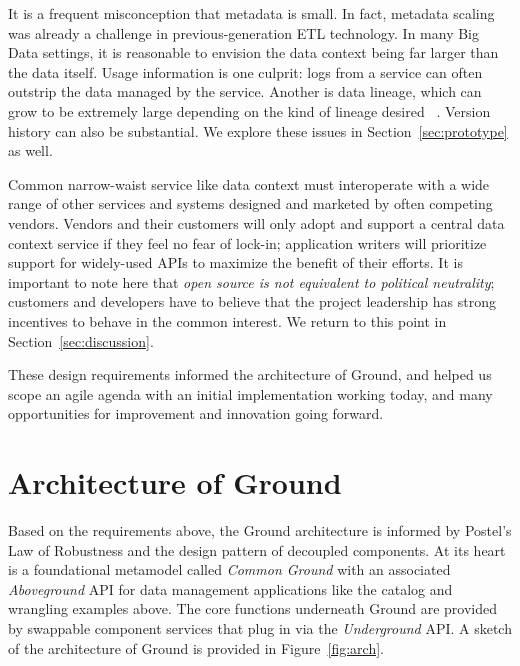 \documentclass{sig-alternate}
\begin{document}
 It is a frequent misconception that metadata is small. In fact, metadata scaling was already a challenge in previous-generation ETL technology. In many Big Data settings, it is reasonable to envision the data context being far larger than the data itself. Usage information is one culprit:  logs from a service can often outstrip the data managed by the service. Another is data lineage, which can grow to be extremely large
depending on the kind of lineage desired
~\cite{cheney2009provenance}.  Version history can also be substantial. 
We explore these issues in Section~\ref{sec:prototype} as well.

Common narrow-waist service like data context must interoperate with a wide range of other services and systems designed and marketed by often competing vendors.
Vendors and their customers will only adopt and support a central data context service if they feel no fear of lock-in; application writers will prioritize support for widely-used APIs to maximize the benefit of their efforts. 
It is important to note here that \emph{open source is not equivalent to political neutrality}; customers and developers have to believe that the project leadership has strong incentives to behave in the common interest. 
We return to this point in Section~\ref{sec:discussion}.

\smallitembot
These design requirements informed the architecture of Ground, and helped us scope an agile agenda with an initial implementation working today, and many opportunities for improvement and innovation going forward.

\section{Architecture of Ground}
\label{sec:arch}
Based on the requirements above, the Ground architecture is informed by Postel's Law of Robustness and the design pattern of decoupled components. 
At its heart is a foundational metamodel called \emph{Common Ground} with an associated \emph{Aboveground} API for data management applications like the catalog and wrangling examples above. 
The core functions underneath Ground are provided by swappable component services that plug in via the \emph{Underground} API. 
A sketch of the architecture of Ground is provided in Figure~\ref{fig:arch}.
\end{document}
